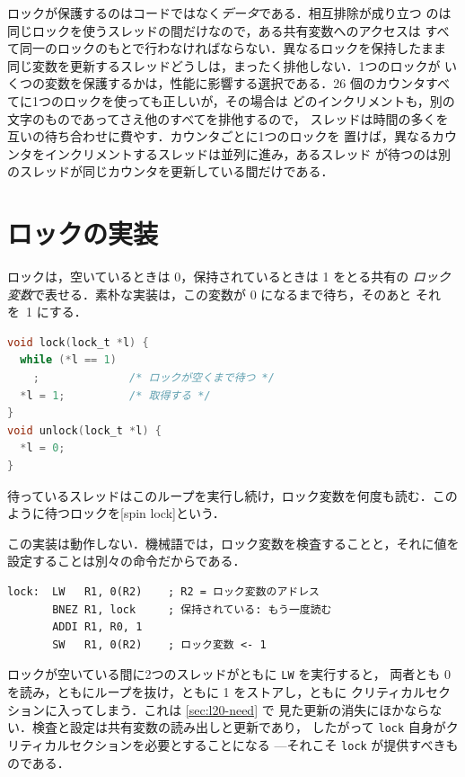 \documentclass[../main.tex]{subfiles}
\begin{document}
ロックが保護するのはコードではなく\emph{データ}である．相互排除が成り立つ
のは同じロックを使うスレッドの間だけなので，ある共有変数へのアクセスは
すべて同一のロックのもとで行わなければならない．異なるロックを保持したまま
同じ変数を更新するスレッドどうしは，まったく排他しない．1つのロックが
いくつの変数を保護するかは，性能に影響する選択である．26 個のカウンタすべてに1つのロックを使っても正しいが，その場合は
どのインクリメントも，別の文字のものであってさえ他のすべてを排他するので，
スレッドは時間の多くを互いの待ち合わせに費やす．カウンタごとに1つのロックを
置けば，異なるカウンタをインクリメントするスレッドは並列に進み，あるスレッド
が待つのは別のスレッドが同じカウンタを更新している間だけである．

\section{ロックの実装}
\label{sec:l20-implementing}

ロックは，空いているときは 0，保持されているときは 1 をとる共有の
\emph{ロック変数}で表せる．素朴な実装は，この変数が 0 になるまで待ち，そのあと
それを~1 にする．
\begin{lstlisting}[language=C, numbers=none]
void lock(lock_t *l) {
  while (*l == 1)
    ;              /* ロックが空くまで待つ */
  *l = 1;          /* 取得する */
}
void unlock(lock_t *l) {
  *l = 0;
}
\end{lstlisting}
待っているスレッドはこのループを実行し続け，ロック変数を何度も読む．この
ように待つロックを[spin lock]という．

この実装は動作しない．機械語では，ロック変数を検査することと，それに値を
設定することは別々の命令だからである．
\begin{lstlisting}[language={[x86masm]Assembler}, numbers=none, deletekeywords={lock}]
lock:  LW   R1, 0(R2)    ; R2 = ロック変数のアドレス
       BNEZ R1, lock     ; 保持されている: もう一度読む
       ADDI R1, R0, 1
       SW   R1, 0(R2)    ; ロック変数 <- 1
\end{lstlisting}
ロックが空いている間に2つのスレッドがともに \texttt{LW} を実行すると，
両者とも 0 を読み，ともにループを抜け，ともに 1 をストアし，ともに
クリティカルセクションに入ってしまう．これは \cref{sec:l20-need} で
見た更新の消失にほかならない．検査と設定は共有変数の読み出しと更新であり，
したがって \texttt{lock} 自身がクリティカルセクションを必要とすることになる
---それこそ \texttt{lock} が提供すべきものである．
\end{document}
